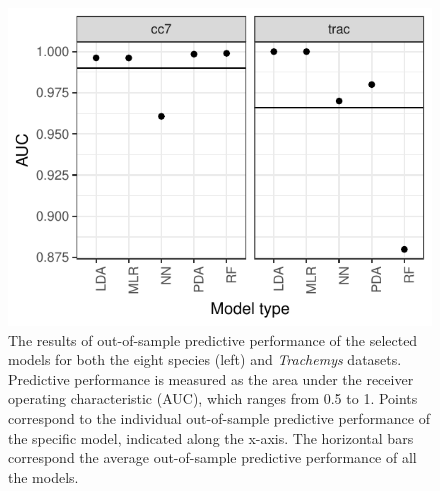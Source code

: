 \documentclass[11pt]{article}
\begin{document}
\begin{figure}[h!]
  \centering
  \includegraphics[height = 0.6\textheight, width = \textwidth, keepaspectratio = true]{figure/other_oos_sel}
  \caption{The results of out-of-sample predictive performance of the selected models for both the eight species (left) and \textit{Trachemys} datasets. Predictive performance is measured as the area under the receiver operating characteristic (AUC), which ranges from 0.5 to 1. Points correspond to the individual out-of-sample predictive performance of the specific model, indicated along the x-axis. The horizontal bars correspond the average out-of-sample predictive performance of all the models.}
  \label{fig:other_oos}
\end{figure}
\end{document}
